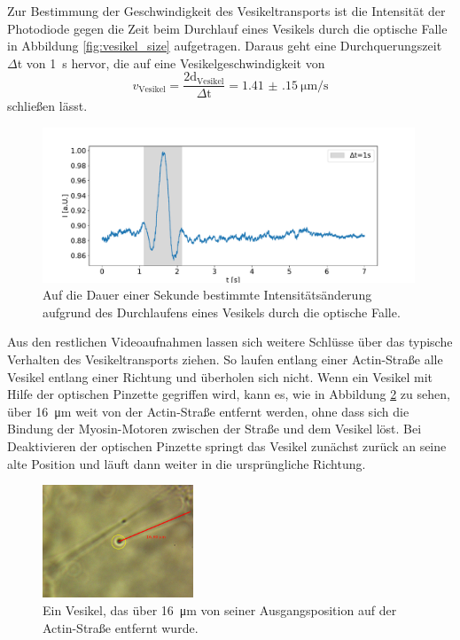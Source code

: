         \FloatBarrier
        \newpage
        Zur Bestimmung der Geschwindigkeit des Vesikeltransports ist die Intensität der Photodiode gegen die Zeit beim Durchlauf eines Vesikels durch die optische Falle in Abbildung 
        \ref{fig:vesikel_size} aufgetragen. Daraus geht eine Durchquerungszeit $\Delta$t von \SI{1}{\second} hervor, die auf eine Vesikelgeschwindigkeit von 
        \begin{equation*}
            v_{\text{Vesikel}} = \frac{2\text{d}_\text{Vesikel}}{\Delta\text{t}} = \SI{1.41(15)}{\micro\metre\per\second}
        \end{equation*}
        schließen lässt.
        \FloatBarrier
        \begin{figure}[h]
        \centering
        \includegraphics[width = 0.99\textwidth]{v_vesikel.pdf}
        \caption{Auf die Dauer einer Sekunde bestimmte Intensitätsänderung aufgrund des Durchlaufens eines Vesikels durch die optische Falle.}
        \label{fig:v_vesikel}
        \end{figure}
        \FloatBarrier
        \newpage
        Aus den restlichen Videoaufnahmen lassen sich weitere Schlüsse über das typische Verhalten des Vesikeltransports ziehen. So laufen entlang einer Actin-Straße alle Vesikel entlang einer Richtung
        und überholen sich nicht. Wenn ein Vesikel mit Hilfe der optischen Pinzette gegriffen wird, kann es, wie in Abbildung \ref{fig:vesikel_abstand} zu sehen, über \SI{16}{\micro\metre} weit von der 
        Actin-Straße entfernt werden, ohne dass sich die Bindung der Myosin-Motoren zwischen der Straße und dem Vesikel löst. Bei Deaktivieren der optischen Pinzette springt das Vesikel zunächst zurück 
        an seine alte Position und läuft dann weiter in die ursprüngliche Richtung. 
        \FloatBarrier
        \begin{figure}[h]
        \centering
        \includegraphics[width = 0.4\textwidth]{pictures/vesikel_abstand.png}
        \caption{Ein Vesikel, das über \SI{16}{\micro\metre} von seiner Ausgangsposition auf der Actin-Straße entfernt wurde.}
        \label{fig:vesikel_abstand}
        \end{figure}
